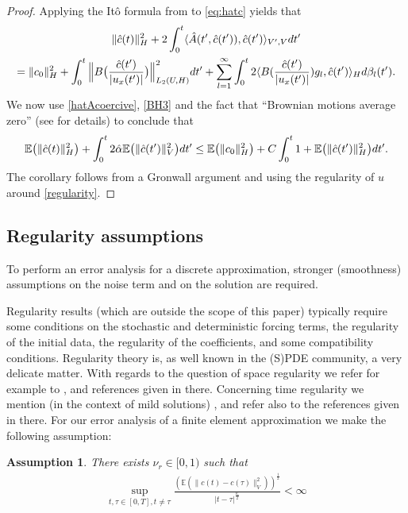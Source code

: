 \documentclass[a4paper,10pt]{article}
\newtheorem{ass}[cor]{Assumption}
\numberwithin{equation}{section}
\begin{document}
\begin{proof}
Applying the It\^{o} formula 
 from \cite[Theorem 4.2.5]{RoecknerBuch} to \eqref{eq:hatc} yields that
\begin{multline*}
 \| \hat{c}(t) \|_{H}^2 + 2 \int_0^t \langle \hat{A}(t',\hat{c}(t')),\hat{c}(t') \rangle_{V',V} dt' \\
 = \| c_0 \|_{H}^2 + \int_0^t \Big{\|} B \big{(} \frac{\hat{c}(t')}{|u_{x}(t')|} \big{)} \Big{\|}_{L_2(U,H)}^2 dt' + \sum_{l=1}^{\infty} \int_0^t 2 \langle B ( \frac{\hat{c}(t')}{|u_{x}(t')|} ) g_l, \hat{c}(t') \rangle_{H} d \beta_{l}(t').
\end{multline*}
We now use \eqref{hatAcoercive}, \eqref{BH3} and the fact that ``Brownian motions average zero'' (see \cite[Remark~4.2.8]{RoecknerBuch} for details) to conclude that
\[
 \mathbb{E} \big{(} \| \hat{c}(t) \|_{H}^2 \big{)} + \int_0^t 2 \hat{\alpha} \mathbb{E} \big{(} \| \hat{c}(t') \|_{V}^2 \big{)} dt' \leq \mathbb{E} \big{(} \| c_0 \|_{H}^2 \big{)} + C \int_0^t 1 + \mathbb{E} \big{(} \| \hat{c}(t') \|_{H}^2 \big{)} dt'.
\]
The corollary follows from a Gronwall argument and using the regularity of $u$ around \eqref{regularity}.
\end{proof}


\subsection{Regularity assumptions}

To perform an error analysis for a discrete approximation, stronger (smoothness) assumptions on the noise term and on the solution are required.

Regularity results (which are outside the scope of this paper) typically require some conditions on the stochastic and deterministic forcing terms, the regularity of the initial data, the regularity of the coefficients, and some compatibility conditions. Regularity theory is, as well known in the (S)PDE community, a very delicate matter. With regards to the question of space regularity we refer for example to \cite{Zhang07}, \cite{Hof13} and references given in there. Concerning time regularity we mention (in the context of mild solutions) \cite{KruseLarsson12}, \cite{Kruse14} and refer also to the references given in there. For our error analysis of a finite element approximation we make the following assumption:
\begin{ass}\label{lass-cholder}
There exists $\nu_{r} \in [0,1)$ such that
 \begin{align}\label{ass-cholder}
 \sup_{t, \tau \in [0,T], t \neq \tau} \frac{(\mathbb{E}(\| c(t) - c(\tau) \|_{V}^{2}))^{\frac{1}{2}}}{|t -\tau|^{\frac{\nu_{r}}{2} }} < \infty
 \end{align}
\end{ass}
\end{document}
